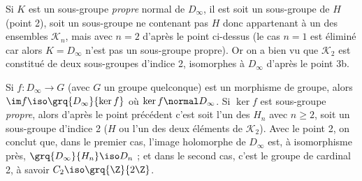 \begin{enumerate}[1)]
Si $K$ est un sous-groupe \emph{propre} normal de $D_{\infty}$, il est soit un sous-groupe de $H$ (point 2), soit un sous-groupe ne contenant pas $H$ donc appartenant à un des ensembles $\mathcal{K}_n$, mais avec $n=2$ d'après le point ci-dessus 
(le cas $n=1$ est éliminé car alors $K=D_{\infty}$ n'est pas un sous-groupe propre). Or on a bien vu que $\mathcal{K}_2$ est constitué de deux sous-groupes d'indice 2, isomorphes à $D_{\infty}$ d'après le point 3b.\medskip

Si $f\colon D_{\infty}\to G$ (avec $G$ un groupe quelconque) est un morphisme de groupe, alors $\im f \iso \grq{D_{\infty}}{\ker f}$ où $\ker f \normal D_{\infty}$. Si $\ker f$ est sous-groupe \emph{propre}, 
alors d'après le point précédent c'est soit l'un des $H_n$ avec $n\geqslant 2$, soit un sous-groupe d'indice 2 ($H$ ou l'un des deux éléments de $\mathcal{K}_2$). 
Avec le point 2, on conclut que, dans le premier cas, l'image holomorphe de $D_{\infty}$ est, à isomorphisme près, $\grq{D_{\infty}}{H_n}\iso D_n$ ; et dans le second cas, c'est le groupe de cardinal 2, à savoir $C_2\iso \grq{\Z}{2\Z}$.
\end{enumerate}
